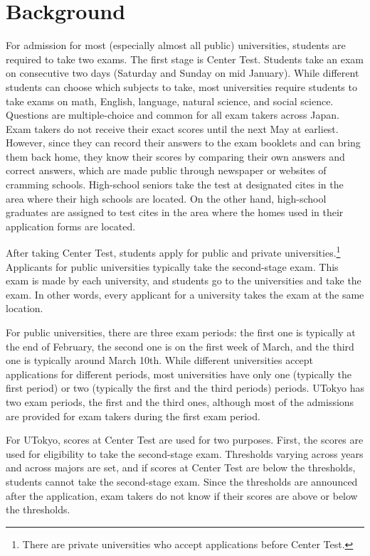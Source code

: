 \documentclass[12pt,letterpaper]{article}
\begin{document}
\section{Background}

For admission for most (especially almost all public) universities, students are required to take two exams.
The first stage is Center Test.
Students take an exam on consecutive two days (Saturday and Sunday on mid January).
While different students can choose which subjects to take, most universities require students to take exams on math, English, language, natural science, and social science.
Questions are multiple-choice and common for all exam takers across Japan.
Exam takers do not receive their exact scores until the next May at earliest.
However, since they can record their answers to the exam booklets and can bring them back home, they know their scores by comparing their own answers and correct answers, which are made public through newspaper or websites of cramming schools.
High-school seniors take the test at designated cites in the area where their high schools are located.
On the other hand, high-school graduates are assigned to test cites in the area where the homes used in their application forms are located.

After taking Center Test, students apply for public and private universities.\footnote{
  There are private universities who accept applications before Center Test.
}
Applicants for public universities typically take the second-stage exam.
This exam is made by each university, and students go to the universities and take the exam.
In other words, every applicant for a university takes the exam at the same location.

For public universities, there are three exam periods: the first one is typically at the end of February, the second one is on the first week of March, and the third one is typically around March 10th.
While different universities accept applications for different periods, most universities have only one (typically the first period) or two (typically the first and the third periods) periods.
UTokyo has two exam periods, the first and the third ones, although most of the admissions are provided for exam takers during the first exam period.

For UTokyo, scores at Center Test are used for two purposes.
First, the scores are used for eligibility to take the second-stage exam.
Thresholds varying across years and across majors are set, and if scores at Center Test are below the thresholds, students cannot take the second-stage exam.
Since the thresholds are announced after the application, exam takers do not know if their scores are above or below the thresholds. 
\end{document}
